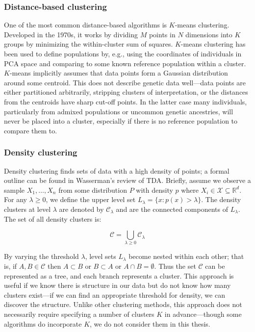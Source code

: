 \subsubsection{Distance-based clustering}

One of the most common distance-based algorithms is $K$-means clustering. Developed in the 1970s, it works by dividing $M$ points in $N$ dimensions into $K$ groups by minimizing the within-cluster sum of squares\citep{hartigan_algorithm_1979}. $K$-means clustering has been used to define populations by, e.g., using the coordinates of individuals in PCA space and comparing to some known reference population within a cluster. $K$-means implicitly assumes that data points form a Gaussian distribution around some centroid\citep{mcinnes_accelerated_2017}. This does not describe genetic data well---data points are either partitioned arbitrarily, stripping clusters of interpretation, or the distances from the centroids have sharp cut-off points. In the latter case many individuals, particularly from admixed populations or uncommon genetic ancestries, will never be placed into a cluster, especially if there is no reference population to compare them to\citep{ding_polygenic_2023}.

\subsubsection{Density clustering}


Density clustering finds sets of data with a high density of points; a formal outline can be found in Wasserman's review of TDA\citep{wasserman_topological_2018}. Briefly, assume we observe a sample $X_{1}, \dots , X_{n}$ from some distribution $P$ with density $p$ where $X_{i} \in \mathcal{X} \subseteq \mathbb{R}^d$. For any $\lambda \ge 0$, we define the upper level set $L_{\lambda} = \{x: p(x) > \lambda \}$. The density clusters at level $\lambda$ are denoted by $\mathcal{C}_{\lambda}$ and are the connected components of $L_{\lambda}$. The set of all density clusters is:

$$ \mathcal{C} = \bigcup_{\lambda \ge 0} \mathcal{C}_{\lambda} $$

By varying the threshold $\lambda$, level sets $L_{\lambda}$ become nested within each other; that is, if $A, B \in \mathcal{C}$ then $A \subset B$ or $B \subset A$ or $A \cap B = \emptyset$. Thus the set $\mathcal{C}$ can be represented as a tree, and each branch represents a cluster. This approach is useful if we know there is structure in our data but do not know how many clusters exist---if we can find an appropriate threshold for density, we can discover the structure. Unlike other clustering methods, this approach does not necessarily require specifying a number of clusters $K$ in advance---though some algorithms do incorporate $K$, we do not consider them in this thesis.

